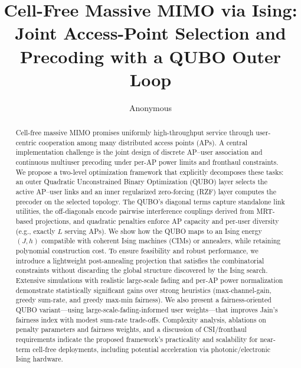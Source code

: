 {\usepackage{algorithm}
\usepackage{algpseudocode}
\usepackage{booktabs}
\usepackage{siunitx}
\usepackage{cite}
\usepackage{hyperref}
\hypersetup{colorlinks=true, linkcolor=black, citecolor=black, urlcolor=black}

\newcommand{\E}{\mathbb{E}}
\newcommand{\R}{\mathbb{R}}
\newcommand{\1}{\mathbf{1}}



\title{Cell-Free Massive MIMO via Ising: Joint Access-Point Selection and Precoding with a QUBO Outer Loop}

\author{Anonymous}
\maketitle

\begin{abstract}
Cell-free massive MIMO promises uniformly high-throughput service through user-centric cooperation among many distributed access points (APs). A central implementation challenge is the joint design of discrete AP–user association and continuous multiuser precoding under per-AP power limits and fronthaul constraints. We propose a two-level optimization framework that explicitly decomposes these tasks: an outer Quadratic Unconstrained Binary Optimization (QUBO) layer selects the active AP–user links and an inner regularized zero-forcing (RZF) layer computes the precoder on the selected topology. The QUBO’s diagonal terms capture standalone link utilities, the off-diagonals encode pairwise interference couplings derived from MRT-based projections, and quadratic penalties enforce AP capacity and per-user diversity (e.g., exactly $L$ serving APs). We show how the QUBO maps to an Ising energy $(J,h)$ compatible with coherent Ising machines (CIMs) or annealers, while retaining polynomial construction cost. To ensure feasibility and robust performance, we introduce a lightweight post-annealing projection that satisfies the combinatorial constraints without discarding the global structure discovered by the Ising search. Extensive simulations with realistic large-scale fading and per-AP power normalization demonstrate statistically significant gains over strong heuristics (max-channel-gain, greedy sum-rate, and greedy max-min fairness). We also present a fairness-oriented QUBO variant—using large-scale-fading-informed user weights—that improves Jain’s fairness index with modest sum-rate trade-offs. Complexity analysis, ablations on penalty parameters and fairness weights, and a discussion of CSI/fronthaul requirements indicate the proposed framework’s practicality and scalability for near-term cell-free deployments, including potential acceleration via photonic/electronic Ising hardware.
\end{abstract}

}
